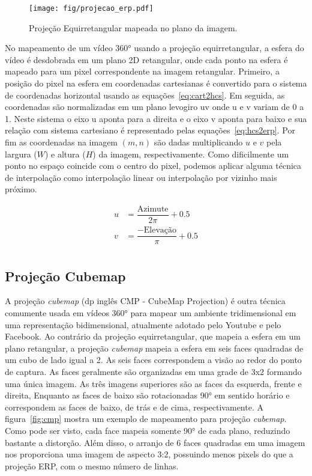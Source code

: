 \begin{figure}[h]
	\centering
	\texttt{[image: fig/projecao\_erp.pdf]}
	\caption{Projeção Equirretangular mapeada no plano da imagem.}
	\label{fig:erp}
\end{figure}

No mapeamento de um vídeo 360° usando a projeção equirretangular, a esfera do vídeo é desdobrada em um plano 2D retangular, onde cada ponto na esfera é mapeado para um pixel correspondente na imagem retangular. Primeiro, a posição do pixel na esfera em coordenadas cartesianas é convertido para o sistema de coordenadas horizontal usando as equações~\ref{eq:cart2hcs}. Em seguida, as coordenadas são normalizadas em um plano levogiro uv onde u e v variam de 0 a 1. Neste sistema o eixo u aponta para a direita e o eixo v aponta para baixo e sua relação com sistema cartesiano é representado pelas equações~\ref{eq:hcs2erp}. Por fim as coordenadas na imagem  $(m, n)$ são dadas multiplicando $u$ e $v$ pela largura ($W$) e altura ($H$) da  imagem, respectivamente. Como dificilmente um ponto no espaço coincide com o centro do pixel, podemos aplicar alguma técnica de interpolação como interpolação linear ou interpolação por vizinho mais próximo.

\begin{equation}
	\label{eq:hcs2erp}
	\begin{split}
    u &= \dfrac{\text{Azimute}}{2\pi} + 0.5 \\
    v &= \dfrac{-\text{Elevação}}{\pi} + 0.5 \\
	\end{split}
\end{equation}

\subsection{Projeção Cubemap}

A projeção \textit{cubemap} (dp inglês CMP - CubeMap Projection) é outra técnica comumente usada em vídeos 360° para mapear um ambiente tridimensional em uma representação bidimensional, atualmente adotado pelo Youtube e pelo Facebook. Ao contrário da projeção equirretangular, que mapeia a esfera em um plano retangular, a projeção \textit{cubemap} mapeia a esfera em seis faces quadradas de um cubo de lado igual a 2. As seis faces correspondem a visão ao redor do ponto de captura. As faces geralmente são organizadas em uma grade de 3x2 formando uma única imagem. As três imagens superiores são as faces da esquerda, frente e direita, Enquanto as faces de baixo são rotacionadas 90° em sentido horário e correspondem as faces de baixo, de trás e de cima, respectivamente. A figura~\ref{fig:cmp} mostra um exemplo de mapeamento para projeção \textit{cubemap}. Como pode ser visto, cada face mapeia somente 90° de cada plano, reduzindo bastante a distorção. Além disso, o arranjo de 6 faces quadradas em uma imagem nos proporciona uma imagem de aspecto 3:2, possuindo menos pixels do que a projeção ERP, com o mesmo número de linhas.

